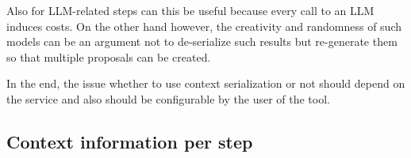 Also for \ac{LLM}-related steps can this be useful because every call to an \ac{LLM} induces costs. On the other hand however, the creativity and randomness of such models can be an argument not to de-serialize such results but re-generate them so that multiple proposals can be created.

In the end, the issue whether to use context serialization or not should depend on the service and also should be configurable by the user of the tool. 

\subsection{Context information per step}
\begin{comment}
In the following, the context created or updated after each step will be explained:

\subsubsection{Code obtaining}
The context after obtaining the source code of the project to analyze is usually the path to the project after it. In most cases, the project is defined in such a manner that there is a single base directory under which all files and directories of the project are located.

Alternatively, one could store the list of all relevant file paths of the project. This requires more storage but makes it easier to filter out files. 

\subsubsection{File Filtering}
Developing a filtering context is more challenging. One major issue is that services suitable for data clump detection offer varying solutions for including and excluding specific files. For instance, PMD which is used by the \textit{DataClumpDoctor} requires that a rule set file is located at a specific location. This rule set file contains inclusion and exclusion rules using regular expressions. 

If files are sent to an \ac{LLM}, the filtering can be performed directly on the handler level, so that more sophisticated  filtering rules can be applied without being restricted to use regular expressions. 

Because the pipeline design separates the context from the handlers, the context has limited information about the handlers and does not know which handler will be executed later. Therefore, the filtering context must be very general to maximize compatibility with all possible handlers. 


\end{comment}
